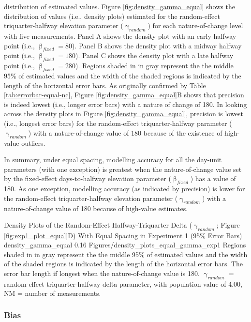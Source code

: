 \documentclass[
12pt, %
twoside,
english]{guelphthesis}
\theoremstyle{definition}
\theoremstyle{definition}
\theoremstyle{definition}
\theoremstyle{definition}
\theoremstyle{remark}
\begin{document}
\noindent distribution of estimated values. Figure \ref{fig:density_gamma_equal} shows the distribution of values (i.e., density plots) estimated for the random-effect triquarter-halfway elevation parameter (\(\upgamma_{random}\)) for each nature-of-change level with five measurements. Panel A shows the density plot with an early halfway point (i.e., \(\upbeta_{fixed} = 80\)). Panel B shows the density plot with a midway halfway point (i.e., \(\upbeta_{fixed} = 180\)). Panel C shows the density plot with a late halfway point (i.e., \(\upbeta_{fixed} = 280\)). Regions shaded in in gray represent the the middle 95\% of estimated values and the width of the shaded regions is indicated by the length of the horizontal error bars. As originally confirmed by Table \ref{tab:errorbar-equal-nc}, Figure \ref{fig:density_gamma_equal}B shows that precision is indeed lowest (i.e., longer error bars) with a nature of change of 180. In looking across the density plots in Figure \ref{fig:density_gamma_equal}, precision is lowest (i.e., longest error bars) for the random-effect triquarter-halfway parameter (\(\upgamma_{random}\)) with a nature-of-change value of 180 because of the existence of high-value outliers.

In summary, under equal spacing, modelling accuracy for all the day-unit parameters (with one exception) is greatest when the nature-of-change value set by the fixed-effect days-to-halfway elevation parameter (\(\upbeta_{fixed}\)) has a value of 180. As one exception, modelling accuracy (as indicated by precision) is lower for the random-effect triquarter-halfway elevation parameter (\(\upgamma_{random}\)) with a nature-of-change value of 180 because of high-value estimates.
\begin{apaFigure}
[portrait]
[samepage]
[0cm]
{Density Plots of the Random-Effect Halfway-Triquarter Delta ($\upgamma_{random}$; Figure \ref{fig:exp1_plot_equal}D) With Equal Spacing in Experiment 1 (95\% Error Bars)}
{density_gamma_equal}
{0.16}
{Figures/density_plots_equal_gamma_exp1}
{Regions shaded in in gray represent the the middle 95\% of estimated values and the width of the shaded regions is indicated by the length of the horizontal error bars. The error bar length if longest when the nature-of-change value is 180. $\upgamma_{random}$ = random-effect triquarter-halfway delta parameter, with population value of 4.00, NM = number of measurements.}
\end{apaFigure}
\hypertarget{bias-equal-exp1}{%
\subsubsection{Bias}\label{bias-equal-exp1}}
\end{document}
